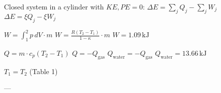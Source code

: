 Closed system in a cylinder with \( KE, PE = 0 \):  
\( \Delta E = \sum_j Q_j - \sum_j W_j \)  
\( \Delta E = \xi Q_j - \xi W_j \)  

\( W = \int_{1}^{2} p \, dV \cdot m \)  
\( W = \frac{R(T_2 - T_1)}{1 - \kappa} \cdot m \)  
\( W = 1.09 \, \text{kJ} \)  

\( Q = m \cdot c_p (T_2 - T_1) \)  
\( Q = -Q_{\text{gas}} \)  
\( Q_{\text{water}} = -Q_{\text{gas}} \)  
\( Q_{\text{water}} = 13.66 \, \text{kJ} \)  

\( T_1 = T_2 \) (Table 1)  

---